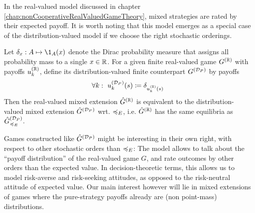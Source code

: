 \documentclass[a4paper]{scrreprt}
\begin{document}
    In the real-valued model discussed in chapter \ref{chap:nonCooperativeRealValuedGameTheory}, mixed strategies are rated by their expected payoff. It is worth noting that this model emerges as a special case of the distribution-valued model if we choose the right stochastic orderings.
    \begin{ex}
        Let $\delta_x: A \mapsto \1_A(x)$ denote the Dirac probability measure that assigns all probability mass to a single $x \in \mathbb{R}$.
        For a given finite real-valued game $G^{(\mathbb{R})}$ with payoffs $u_k^{(\mathbb{R})}$, define its distribution-valued finite counterpart $G^{(\mathcal{D}_P)}$ by payoffs
        \begin{gather*}
            \forall k: ~u_k^{(\mathcal{D}_P)}(s) \coloneqq \delta_{u_k^{(\mathbb{R})}(s)} 
        \end{gather*}
        Then the real-valued mixed extension $\hat{G}^{(\mathbb{R})}$ is equivalent to the distribution-valued mixed extension $\hat{G}^{(\mathcal{D}_P)}$ wrt. $\preccurlyeq_E$, i.e. 
        $\hat{G}^{(\mathbb{R})}$ has the same equilibria as $\hat{G}^{(\mathcal{D}_P)}_{\preccurlyeq_E}$.
    \end{ex}
    Games constructed like $\hat{G}^{(\mathcal{D}_P)}$ might be interesting in their own right, with respect to other stochastic orders than $\preccurlyeq_E$:
    The model allows to talk about the “payoff distribution” of the real-valued game $G$, and rate outcomes by other orders than the expected value. 
    In decision-theoretic terms, this allows us to model risk-averse and risk-seeking attitudes, as opposed to the risk-neutral attitude of expected value. Our main interest however will lie in mixed extensions of games where the pure-strategy payoffs already are (non point-mass) distributions.

    
\end{document}
